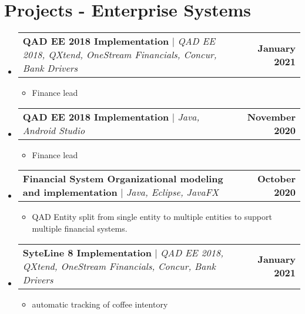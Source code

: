 \documentclass[letterpaper,11pt]{article}
\makeatletter
\newcommand{\resumeItem}[1]{
  \item\small{
    {#1 \vspace{-2pt}}
  }
}
\newcommand{\resumeProjectHeading}[2]{
    \item
    \begin{tabular*}{1.001\textwidth}{l@{\extracolsep{\fill}}r}
      \small#1 & \textbf{\small #2}\\
    \end{tabular*}\vspace{-7pt}
}
\newcommand{\resumeSubHeadingListStart}{\begin{itemize}[leftmargin=0.0in, label={}]}
\newcommand{\resumeSubHeadingListEnd}{\end{itemize}}
\newcommand{\resumeItemListStart}{\begin{itemize}}
\newcommand{\resumeItemListEnd}{\end{itemize}\vspace{-5pt}}
\makeatother
\begin{document}
\section{Projects - Enterprise Systems}
    \vspace{-5pt}
    \resumeSubHeadingListStart
      \resumeProjectHeading
          {\textbf{QAD EE 2018 Implementation} $|$ \emph{QAD EE 2018, QXtend, OneStream Financials, Concur, Bank Drivers}}{January 2021}
          \resumeItemListStart
            \resumeItem{Finance lead }
          \resumeItemListEnd
          \vspace{-13pt}
      \resumeProjectHeading
          {\textbf{QAD EE 2018 Implementation} $|$ \emph{Java, Android Studio}}{November 2020}
          \resumeItemListStart
            \resumeItem{Finance lead}
          \resumeItemListEnd 
          \vspace{-13pt}
      \resumeProjectHeading
          {\textbf{Financial System Organizational modeling and implementation} $|$ \emph{Java, Eclipse, JavaFX}}{October 2020}
          \resumeItemListStart
            \resumeItem{QAD Entity split from single entity to multiple entities to support multiple financial systems.}
          \resumeItemListEnd 
      \resumeProjectHeading
          {\textbf{SyteLine 8 Implementation} $|$ \emph{QAD EE 2018, QXtend, OneStream Financials, Concur, Bank Drivers}}{January 2021}
          \resumeItemListStart
            \resumeItem{automatic tracking of coffee intentory }
          \resumeItemListEnd
          \vspace{-13pt}
    \resumeSubHeadingListEnd
\vspace{+16pt}


\end{document}
